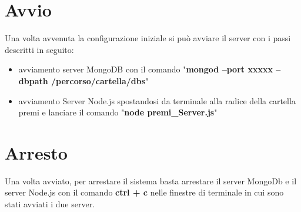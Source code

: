 \newpage

\section{Avvio}
Una volta avvenuta la configurazione iniziale si pu\`{o} avviare il server con i passi descritti in seguito:

\begin{itemize}
\item avviamento server MongoDB con il comando "\textbf{mongod --port xxxxx --dbpath /percorso/cartella/dbs}"
\item  avviamento Server Node.js spostandosi da terminale alla radice della cartella premi e lanciare il comando "\textbf{node premi\_Server.js}" 
\end{itemize}


\section{Arresto}
Una volta avviato, per arrestare il sistema basta arrestare il server MongoDb e il server Node.js con il comando \textbf{ctrl + c} nelle finestre di terminale in cui sono stati avviati i due server.
